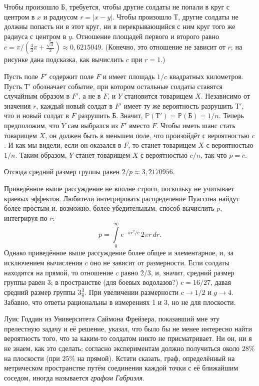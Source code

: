 Чтобы произошло $\text{Б}$, требуется, чтобы другие солдаты не попали в круг с центром в $x$ и радиусом $r=|x-y|$.
Чтобы произошло $\text{Т}$, другие солдаты не должны попасть ни в этот круг, ни в перекрывающийся с ним круг того же радиуса с центром в $y$.
Отношение площадей первого и второго равно $c=\pi/(\tfrac43\pi+\tfrac{\sqrt{3}}{2}) \approx 0{,}6215049$.
(Конечно, это отношение не зависит от $r$; на рисунке дана подсказка, как вычислить $c$ при $r=1$.)

Пусть поле $F'$ содержит поле $F$ и имеет площадь $1/c$ квадратных километров.
Пусть $\text{Т}'$ обозначает событие, при котором остальные солдаты ставятся случайным образом в $F'$, а не в $F$, и $Y$ становится товарищем $X$.
Независимо от значения $r$, каждый новый солдат в $F'$ имеет ту же вероятность разрушить $\text{Т}'$, что и новый солдат в $F$ разрушить $\text{Б}$. 
Значит, $\mathbb{P}(\text{Т}')= \mathbb{P}(\text{Б}) = 1/n$.
Теперь предположим, что $Y$ сам выбрался из $F'$ вместо $F$.
Чтобы иметь шанс стать товарищем $X$, он должен быть в меньшем поле, что произойдёт с вероятностью $c$.
И как мы видели, если он оказался в $F$, то станет товарищем $X$ с вероятностью $1/n$.
Таким образом, $Y$ станет товарищем $X$ с вероятностью $c/n$, так что $p=c$.

Отсюда средний размер группы равен $2/p\approx3{,}2170956$.
\heart

Приведённое выше рассуждение не вполне строго, поскольку не учитывает краевых эффектов.
Любители интегрировать распределение Пуассона 
найдут более простым и, возможно, более убедительным, способ вычислить $p$, интегрируя по $r$:
\[p=\int\limits_0^\infty e^{-\pi r^2/c}\,2\pi r\, dr.\]
Однако приведённое выше рассуждение более общее и элементарное, и, за исключением вычисления $c$ оно не зависит от размерности.
Если солдаты находятся на прямой, то отношение $c$ равно $2/3$, и, значит, средний размер группы равен 3;
в пространстве (для боевых водолазов?) $c = 16/27$, давая средний размер группы $3\tfrac38$.
При увеличении размерности $c\to 1/2$ и $g\to 4$. 
Забавно, что ответы рациональны в измерениях 1 и 3, но не для плоскости.

Луис Годдин из Университета Саймона Фрейзера, показавший мне эту прелестную задачу и её решение, указал, что было бы не менее интересно найти вероятность того, что за каким-то солдатом никто не присматривает.
Ни он, ни я не знаем, как это сделать;
согласно экспериментам должно получиться около $28\%$ на плоскости (при $25\%$ на прямой).
Кстати сказать, граф, определённый на метрическом пространстве путём соединения каждой точки с её ближайшим соседом, иногда называется \emph{графом Габриэля}.

